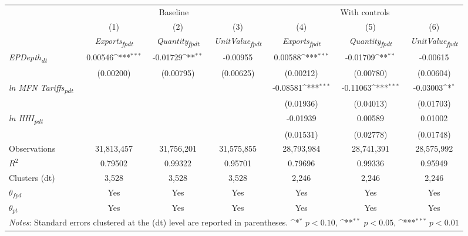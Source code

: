 {
\def\sym#1{\ifmmode^{#1}\else\(^{#1}\)\fi}
\begin{tabular}{l*{6}{c}}
\toprule
&\multicolumn{3}{c}{Baseline}&\multicolumn{3}{c}{With controls}\\\cmidrule(lr){2-4}\cmidrule(lr){5-7}
&(1)&(2)&(3)&(4)&(5)&(6)\\
&\textit{Exports\textsubscript{fpdt}}&\textit{Quantity\textsubscript{fpdt}}&\textit{UnitValue\textsubscript{fpdt}}&\textit{Exports\textsubscript{fpdt}}&\textit{Quantity\textsubscript{fpdt}}&\textit{UnitValue\textsubscript{fpdt}}\\
\midrule
\textit{EPDepth\textsubscript{dt}} & 0.00546\sym{***} & -0.01729\sym{**} & -0.00955 & 0.00588\sym{***} & -0.01709\sym{**} & -0.00615\\
 & (0.00200) & (0.00795) & (0.00625) & (0.00212) & (0.00780) & (0.00604)\\
\addlinespace
\textit{ln MFN Tariffs\textsubscript{pdt}} &  &  &  & -0.08581\sym{***} & -0.11063\sym{***} & -0.03003\sym{*}\\
 &  &  &  & (0.01936) & (0.04013) & (0.01703)\\
\addlinespace
\textit{ln HHI\textsubscript{pdt}} &  &  &  & -0.01939 & 0.00589 & 0.01002\\
 &  &  &  & (0.01531) & (0.02778) & (0.01748)\\
\midrule
Observations & 31,813,457 & 31,756,201 & 31,575,855 & 28,793,984 & 28,741,391 & 28,575,992\\
$R^{2}$ & 0.79502 & 0.99322 & 0.95701 & 0.79696 & 0.99336 & 0.95949\\
Clusters (dt) & 3,528 & 3,528 & 3,528 & 2,246 & 2,246 & 2,246\\
$\theta_{fpd}$ & Yes & Yes & Yes & Yes & Yes & Yes\\
$\theta_{pt}$ & Yes & Yes & Yes & Yes & Yes & Yes\\
\bottomrule
\multicolumn{7}{l}{\footnotesize \textit{Notes}: Standard errors clustered at the (dt) level are reported in parentheses. \sym{*} \(p<0.10\), \sym{**} \(p<0.05\), \sym{***} \(p<0.01\)}\\
\end{tabular}
}
